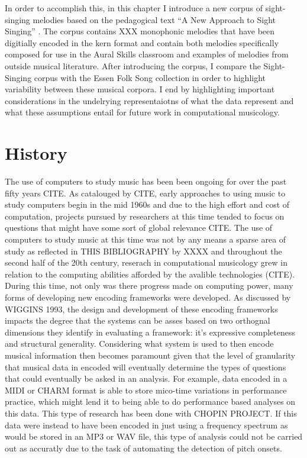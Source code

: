 \documentclass[]{book}
\begin{document}
In order to accomplish this, in this chapter I introduce a new corpus of sight-singing melodies based on the pedagogical text ``A New Approach to Sight Singing'' \citep{berkowitzNewApproachSight2011}.
The corpus contains XXX monophonic melodies that have been digitially encoded in the kern format \citep{huronHumdrumToolkitReference1994} and contain both melodies specifically composed for use in the Aural Skills classroom and examples of melodies from outside musical literature.
After introducing the corpus, I compare the Sight-Singing corpus with the Essen Folk Song \citep{schaffrathEssenFolkSong1995} collection in order to highlight variability between these musical corpora.
I end by highlighting important considerations in the undelrying representaiotns of what the data represent and what these assumptions entail for future work in computational musicology.

\hypertarget{history}{%
\section{History}\label{history}}

The use of computers to study music has been been ongoing for over the past fifty years CITE.
As catalouged by CITE, early approaches to using music to study computers begin in the mid 1960s and due to the high effort and cost of computation, projects pursued by researchers at this time tended to focus on questions that might have some sort of global relevance CITE.
The use of computers to study music at this time was not by any means a sparse area of study as reflected in THIS BIBLIOGRAPHY by XXXX and throughout the second half of the 20th century, reserach in computational musicology grew in relation to the computing abilities afforded by the avalible technologies (CITE).
During this time, not only was there progress made on computing power, many forms of developing new encoding frameworks were developed.
As discussed by WIGGINS 1993, the design and development of these encoding frameworks impacts the degree that the systems can be asses based on two orthognal dimensions they identify in evaluating a framework: it's expressive completeness and structural generality.
Considering what system is used to then encode musical information then becomes paramount given that the level of granularity that musical data in encoded will eventually determine the types of questions that could eventually be asked in an analysis.
For example, data encoded in a MIDI or CHARM format is able to store mico-time variations in performance practice, which might lend it to being able to do performance based analyses on this data.
This type of research has been done with CHOPIN PROJECT.
If this data were instead to have been encoded in just using a frequency spectrum as would be stored in an MP3 or WAV file, this type of analysis could not be carried out as accuratly due to the task of automating the detection of pitch onsets.
\end{document}
